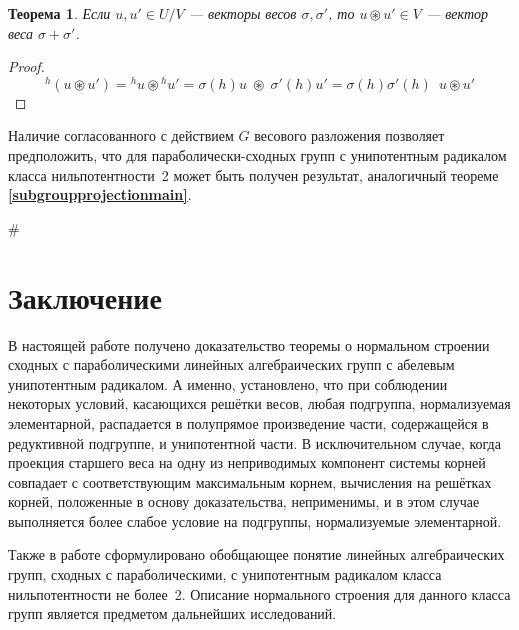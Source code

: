 \documentclass[12pt]{matmex-diploma}
\theoremstyle{mystyleni}
\theoremstyle{mystyle}
\newtheorem{thm}{Теорема}
\newcommand\refb[1]{\textbf{\ref{#1}}}
\begin{document}
\begin{thm}
Если $u,u' \in U/V$ --- векторы весов $\sigma, \sigma'$, то $u \circledast u' \in V$ --- вектор веса $\sigma + \sigma'$.
\end{thm}
\begin{proof}
$$
{}^h(u \circledast u') = {}^h u  \circledast {}^h u' = \sigma(h) u \; \circledast \; \sigma'(h) u' = \sigma(h)\sigma'(h) \enspace u \circledast u'
$$
\end{proof}

Наличие согласованного с действием $G$ весового разложения позволяет предположить, что для параболически-сходных групп с унипотентным радикалом класса нильпотентности~2 может быть получен результат, аналогичный теореме \refb{subgroupprojectionmain}.

\#

\section{Заключение}

В настоящей работе получено доказательство теоремы о нормальном строении сходных с параболическими линейных алгебраических групп с абелевым унипотентным радикалом.
А именно, установлено, что при соблюдении некоторых условий, касающихся решётки весов, любая подгруппа, нормализуемая элементарной, распадается в полупрямое произведение части, содержащейся в редуктивной подгруппе, и унипотентной части. В исключительном случае, когда проекция старшего веса на одну из неприводимых компонент системы корней совпадает с соответствующим максимальным корнем, вычисления на решётках корней, положенные в основу доказательства, неприменимы, и в этом случае выполняется более слабое условие на подгруппы, нормализуемые элементарной.

Также в работе сформулировано обобщающее понятие линейных алгебраических групп, сходных с параболическими, с унипотентным радикалом класса нильпотентности не более~2. Описание нормального строения для данного класса групп является предметом дальнейших исследований.

\setmonofont[Mapping=tex-text]{CMU Typewriter Text}


\end{document}
